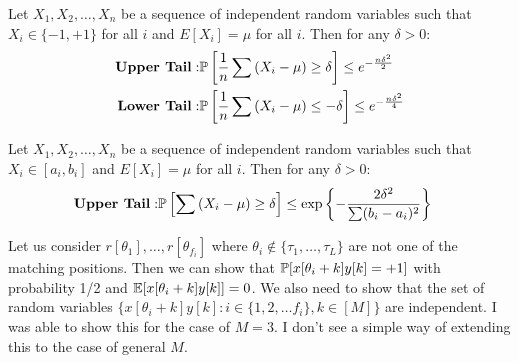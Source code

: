 \appendices
\begin{lemma}
\label{Lem:Chernoff}
Let $X_1, X_2,\ldots, X_n$ be a sequence of independent random variables such that $X_i \in\{-1, +1\}$ for all $i$ and $E[X_i]=\mu$ for all $i$. Then for any $\delta>0$:
\begin{align*}
\text{\textbf{Upper Tail}}: &\mathbb{P}\left[\frac{1}{n}\sum \left(X_i-\mu\right)\geq \delta\right]\leq e^{-\frac{n\delta^2}{2}}\\
\textbf{Lower Tail}: &\mathbb{P}\left[\frac{1}{n}\sum \left(X_i-\mu\right)\leq -\delta\right]\leq e^{-\frac{n\delta^2}{4}}
\end{align*}
\end{lemma}

\begin{lemma}
\label{Lem:Chernoff2}
Let $X_1, X_2,\ldots, X_n$ be a sequence of independent random variables such that $X_i \in[a_i, b_i]$ and $E[X_i]=\mu$ for all $i$. Then for any $\delta>0$:
\begin{align*}
\text{\textbf{Upper Tail}}: &\mathbb{P}\left[\sum \left(X_i-\mu\right)\geq \delta\right]\leq \exp\left\lbrace-\frac{2\delta^2}{\sum(b_i-a_i)^2}\right\rbrace
\end{align*}
\end{lemma}

\begin{remark}
\label{Lem:CorrelationCoefficient}
Let us consider $r[\theta_1],\ldots ,r[\theta_{f_i}]$ where $\theta_i \notin \{\tau_1,\ldots, \tau_L\}$ are not one of the matching positions. Then we can show that $\mathbb{P}[x[\theta_i+k]y[k]=+1]$ with probability 1/2 and $\mathbb{E}[x[\theta_i+k]y[k]]=0$. We also need to show that  the set of random variables  $\{x[\theta_i+k]y[k]: i\in\{1,2,\ldots f_i\},k\in[M]\}$ are independent. I was able to show this for the case of $M=3$. I don't see a simple way of extending this to the case of general $M$.
\end{remark}

